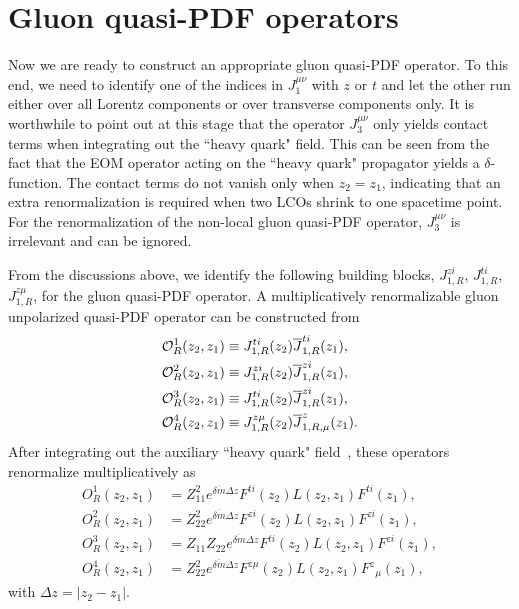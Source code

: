 \section{Gluon quasi-PDF operators}\label{sec:operators}

Now we are ready to construct an appropriate gluon quasi-PDF operator.
To this end, we need to identify one of the indices in $J_1^{\mu\nu}$ with $z$ or $t$ and let the other run either over all Lorentz components or over transverse components only. It is worthwhile to point out at this stage that the operator $J_3^{\mu\nu}$ only yields contact terms when integrating out the ``heavy quark" field. This can be seen from the fact that the EOM operator acting on the ``heavy quark" propagator yields a $\delta$-function. The contact terms do not vanish only when $z_2=z_1$, indicating that an extra renormalization is required when two LCOs shrink to one spacetime point. For the renormalization of the non-local gluon quasi-PDF operator, $J_3^{\mu\nu}$ is irrelevant and can be ignored.

From the discussions above, we identify the following building blocks, $J_{1,R}^{zi}$, $J_{1,R}^{ti}$, $J_{1,R}^{z\mu}$, for the gluon quasi-PDF operator. A multiplicatively renormalizable gluon unpolarized quasi-PDF operator can be constructed from
\begin{align}
 {\cal O}^{1}_R(z_2,z_1) &\equiv  J_{1,R}^{ti}(z_2) \overline J_{1,R}^{ti}(z_1), \nonumber\\
 {\cal O}^{2}_R(z_2,z_1) &\equiv  J_{1,R}^{zi}(z_2)\overline J_{1,R}^{zi}(z_1), \nonumber\\
 {\cal O}^{3}_R(z_2, z_1) &\equiv    J_{1,R}^{ti}(z_2) \overline J_{1,R}^{zi}(z_1),\nonumber\\
 {\cal O}^{4}_R(z_2, z_1)  &\equiv  J_{1,R}^{z\mu}(z_2) \overline J_{1,R,\mu}^{z}(z_1).
\end{align}
After integrating out the auxiliary ``heavy quark" field~\cite{Ji:2017oey}, these operators renormalize multiplicatively as
\begin{align}
{O}^{1}_R(z_2, z_1) &=Z_{11}^2 e^{\overline{\delta { m}}\Delta z}F^{ti}(z_2) L(z_2,z_1) F^{ti}(z_1),\nonumber\\
 {  O}^{2}_R(z_2,z_1) &=Z_{22}^2 e^{\overline{\delta { m}}\Delta z} F^{zi}(z_2) L(z_2,z_1) F^{zi}(z_1),\nonumber\\
 {O}^{3}_R(z_2,z_1) &= Z_{11}Z_{22} e^{\overline{\delta { m}}\Delta z} F^{ti}(z_2) L(z_2,z_1) F^{zi}(z_1),\nonumber\\
O^{4}_R(z_2,z_1)
& = Z_{22}^2 e^{\overline{\delta { m}}\Delta z} F^{z\mu}(z_2) L(z_2,z_1) F^{z}_{\;\;\mu}(z_1),
 \end{align}
with $\Delta z=|z_2-z_1|$.

